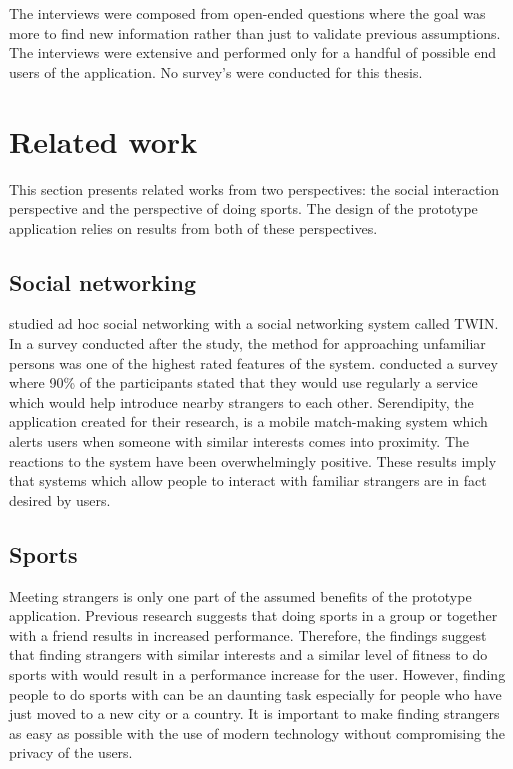The interviews were composed from open-ended questions where the goal was more to find new information rather than just to validate previous assumptions. The interviews were extensive and performed only for a handful of possible end users of the application. No survey's were conducted for this thesis.

\section{Related work}

This section presents related works from two perspectives: the social interaction perspective and the perspective of doing sports. The design of the prototype application relies on results from both of these perspectives.

\subsection{Social networking}
\cite{socialAdHoc} studied ad hoc social networking with a social networking system called TWIN. In a survey conducted after the study, the method for approaching unfamiliar persons was one of the highest rated features of the system. \cite{mobileMatchmaking} conducted a survey where 90\% of the participants stated that they would use regularly a service which would help introduce nearby strangers to each other. Serendipity, the application created for their research, is a mobile match-making system which alerts users when someone with similar interests comes into proximity. The reactions to the system have been overwhelmingly positive. These results imply that systems which allow people to interact with familiar strangers are in fact desired by users.

\subsection{Sports}
Meeting strangers is only one part of the assumed benefits of the prototype application. Previous research suggests that doing sports in a group or together with a friend results in increased performance. Therefore, the findings suggest that finding strangers with similar interests and a similar level of fitness to do sports with would result in a performance increase for the user. However, finding people to do sports with can be an daunting task especially for people who have just moved to a new city or a country. It is important to make finding strangers as easy as possible with the use of modern technology without compromising the privacy of the users.

